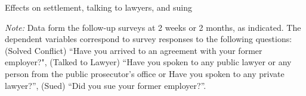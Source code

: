 \documentclass[12 pt]{article}
\newenvironment{figurenotes}[1][\footnotesize{Note}]{\begin{minipage}[t]{\linewidth}\footnotesize{\itshape#1: }}{\end{minipage}}
\begin{document}
\begin{table}[!ht]
    \caption{Effects on settlement, talking to lawyers, and suing} 
    \label{tab:7_TE_action}
    \center
    \notesize{}
    \begin{figurenotes}
    Data form the follow-up surveys at 2 weeks or 2 months, as indicated. The dependent variables correspond to survey responses to the following questions: (Solved Conflict) “Have you arrived to an agreement with your former employer?", (Talked to Lawyer) “Have you spoken to any public lawyer or any person from the public prosecutor's office or Have you spoken to any private lawyer?”, (Sued) “Did you sue your former employer?”.
    \end{figurenotes}
  
\end{table}
\end{document}
